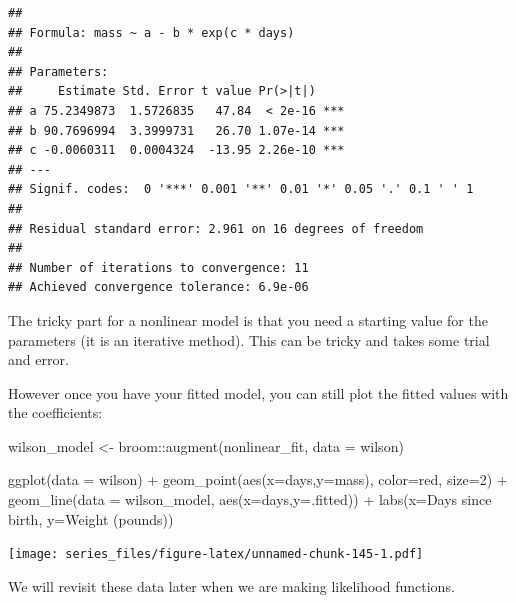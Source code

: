 \documentclass[
]{book}
\newenvironment{Shaded}{\begin{snugshade}}{\end{snugshade}}
\newcommand{\AttributeTok}[1]{\textcolor[rgb]{0.77,0.63,0.00}{#1}}
\newcommand{\DecValTok}[1]{\textcolor[rgb]{0.00,0.00,0.81}{#1}}
\newcommand{\FunctionTok}[1]{\textcolor[rgb]{0.00,0.00,0.00}{#1}}
\newcommand{\NormalTok}[1]{#1}
\newcommand{\OtherTok}[1]{\textcolor[rgb]{0.56,0.35,0.01}{#1}}
\newcommand{\SpecialCharTok}[1]{\textcolor[rgb]{0.00,0.00,0.00}{#1}}
\newcommand{\StringTok}[1]{\textcolor[rgb]{0.31,0.60,0.02}{#1}}
\theoremstyle{definition}
\theoremstyle{definition}
\theoremstyle{definition}
\theoremstyle{remark}
\begin{document}
\begin{verbatim}
## 
## Formula: mass ~ a - b * exp(c * days)
## 
## Parameters:
##     Estimate Std. Error t value Pr(>|t|)    
## a 75.2349873  1.5726835   47.84  < 2e-16 ***
## b 90.7696994  3.3999731   26.70 1.07e-14 ***
## c -0.0060311  0.0004324  -13.95 2.26e-10 ***
## ---
## Signif. codes:  0 '***' 0.001 '**' 0.01 '*' 0.05 '.' 0.1 ' ' 1
## 
## Residual standard error: 2.961 on 16 degrees of freedom
## 
## Number of iterations to convergence: 11 
## Achieved convergence tolerance: 6.9e-06
\end{verbatim}

The tricky part for a nonlinear model is that you need a starting value for the parameters (it is an iterative method). This can be tricky and takes some trial and error.

However once you have your fitted model, you can still plot the fitted values with the coefficients:

\begin{Shaded}
\begin{Highlighting}[]
\NormalTok{wilson\_model }\OtherTok{\textless{}{-}}\NormalTok{ broom}\SpecialCharTok{::}\FunctionTok{augment}\NormalTok{(nonlinear\_fit, }\AttributeTok{data =}\NormalTok{ wilson)}

\FunctionTok{ggplot}\NormalTok{(}\AttributeTok{data =}\NormalTok{ wilson) }\SpecialCharTok{+}
  \FunctionTok{geom\_point}\NormalTok{(}\FunctionTok{aes}\NormalTok{(}\AttributeTok{x=}\NormalTok{days,}\AttributeTok{y=}\NormalTok{mass),}
             \AttributeTok{color=}\StringTok{\textquotesingle{}red\textquotesingle{}}\NormalTok{,}
             \AttributeTok{size=}\DecValTok{2}\NormalTok{) }\SpecialCharTok{+}
  \FunctionTok{geom\_line}\NormalTok{(}\AttributeTok{data =}\NormalTok{ wilson\_model,}
            \FunctionTok{aes}\NormalTok{(}\AttributeTok{x=}\NormalTok{days,}\AttributeTok{y=}\NormalTok{.fitted)) }\SpecialCharTok{+}
  \FunctionTok{labs}\NormalTok{(}\AttributeTok{x=}\StringTok{\textquotesingle{}Days since birth\textquotesingle{}}\NormalTok{,}
         \AttributeTok{y=}\StringTok{\textquotesingle{}Weight (pounds)\textquotesingle{}}\NormalTok{)}
\end{Highlighting}
\end{Shaded}

\texttt{[image: series\_files/figure-latex/unnamed-chunk-145-1.pdf]}

We will revisit these data later when we are making likelihood functions.

\newpage
\end{document}
